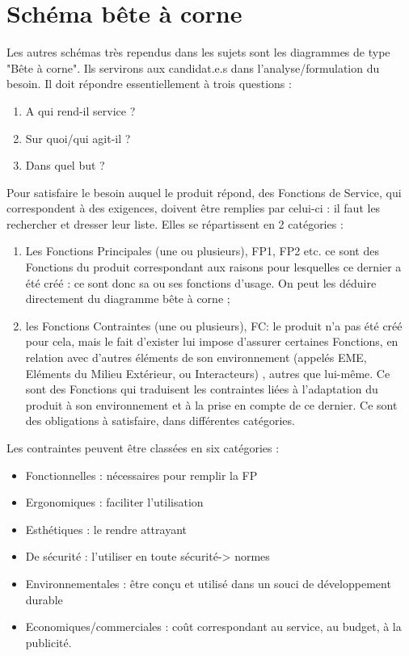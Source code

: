 \documentclass[
	11pt, %
	fleqn, %
	a4paper, %
]{LegrandOrangeBook}
\begin{document}
\section{Schéma bête à corne}
Les autres schémas très rependus dans les sujets sont les diagrammes de type "Bête à corne". Ils servirons aux candidat.e.s dans l'analyse/formulation du besoin. Il doit répondre essentiellement à trois questions :
\begin{enumerate}
    \item A qui rend-il service ?
    \item Sur quoi/qui agit-il ?
    \item Dans quel but ?\\
\end{enumerate}



Pour satisfaire le besoin auquel le produit répond, des Fonctions de Service, qui correspondent à des exigences, doivent être remplies par celui-ci : il faut les rechercher et dresser leur liste. Elles se répartissent en 2 catégories :

\begin{enumerate}
    \item Les Fonctions Principales (une ou plusieurs), FP1, FP2 etc. ce sont des Fonctions du produit correspondant aux raisons
pour lesquelles ce dernier a été créé : ce sont donc sa ou ses fonctions d’usage. On peut les déduire directement du
diagramme bête à corne ;
    \item les Fonctions Contraintes (une ou plusieurs), FC: le produit n’a pas été créé pour cela, mais le fait d’exister lui impose d’assurer certaines Fonctions, en relation avec d’autres éléments de son environnement (appelés EME, Eléments du Milieu Extérieur, ou Interacteurs) , autres que lui-même. Ce sont des Fonctions qui traduisent les contraintes liées à l’adaptation du produit à son environnement et à la prise en compte de ce dernier. Ce sont des obligations à satisfaire, dans différentes catégories.\\
\end{enumerate}


Les contraintes peuvent être classées en six
catégories :
\begin{itemize}
\item  Fonctionnelles : nécessaires pour remplir la FP
\item  Ergonomiques : faciliter l’utilisation
\item  Esthétiques : le rendre attrayant
\item  De sécurité : l’utiliser en toute sécurité-> normes
\item  Environnementales : être conçu et utilisé dans un
souci de développement durable
\item Economiques/commerciales : coût correspondant au
service, au budget, à la publicité.
\end{itemize}
\end{document}
